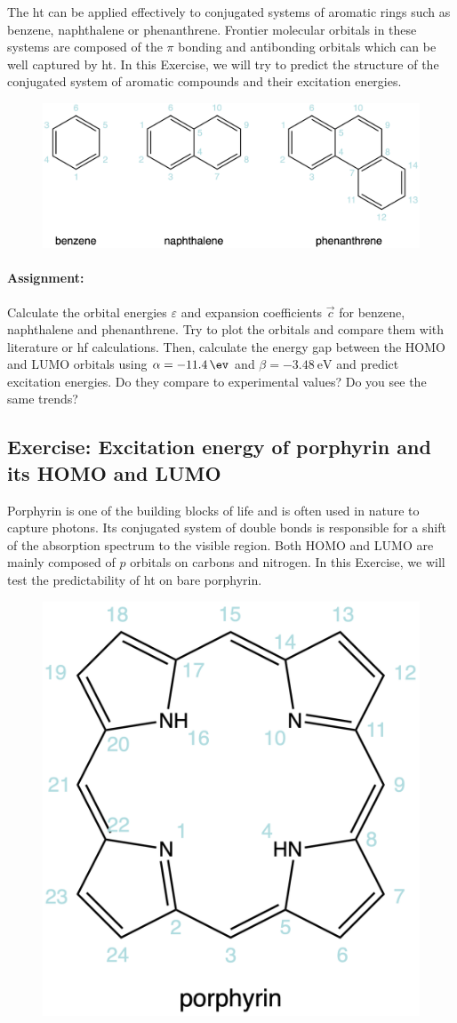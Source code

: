 The \acrlong{ht} can be applied effectively to conjugated systems of aromatic rings such as benzene, naphthalene or phenanthrene. Frontier molecular orbitals in these systems are composed of the $\pi$ bonding and antibonding orbitals which can be well captured by \acrshort{ht}. In this Exercise, we will try to predict the structure of the conjugated system of aromatic compounds and their excitation energies. 

\begin{figure}[ht!]
    \centering
    \includegraphics[width=0.6\linewidth]{scriptum/obrazky/huckel/ex2.png}
    \label{fig:huckel1}
\end{figure}

\paragraph{Assignment:} Calculate the orbital energies $\varepsilon$ and expansion coefficients $\Vec{c}$ for benzene, naphthalene and phenanthrene. Try to plot the orbitals and compare them with literature or \acrlong{hf} calculations. Then, calculate the energy gap between the HOMO and LUMO orbitals using $\alpha = \SI{-11.4}{\ev}$ and $\beta = \SI{-3.48}{\eV}$ and predict excitation energies. Do they compare to experimental values? Do you see the same trends? 

\subsection*{Exercise: Excitation energy of porphyrin and its HOMO and LUMO}

Porphyrin is one of the building blocks of life and is often used in nature to capture photons. Its conjugated system of double bonds is responsible for a shift of the absorption spectrum to the visible region. Both HOMO and LUMO are mainly composed of $p$ orbitals on carbons and nitrogen. In this Exercise, we will test the predictability of \acrshort{ht} on bare porphyrin. 

\begin{figure}[ht!]
    \centering
    \includegraphics[width=0.3\linewidth]{scriptum/obrazky/huckel/ex3.png}
    \label{fig:huckel1}
\end{figure}

